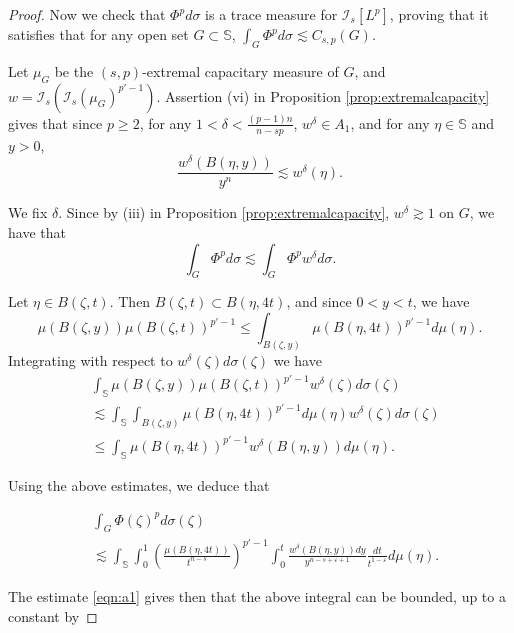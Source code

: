 \documentclass[12pt,twoside,leqno,final]{amsart}
\theoremstyle{plain}
\begin{document}
\begin{proof}
Now we check that $\Phi^pd\sigma$ is a trace measure for $\mathcal{I}_s[L^p]$, proving that it satisfies that for any open set $G\subset {{\mathbb S}}$, $\int_G \Phi^pd\sigma\lesssim C_{s,p}(G)$. 

Let  $\mu_G$ be the $(s,p)$-extremal capacitary measure of $G$, and $w=\mathcal{I}_s(\mathcal{I}_s(\mu_G)^{p'-1})$. Assertion (vi) in Proposition  \ref{prop:extremalcapacity} gives that since $p\geq 2$, for any $1<\delta<\frac{(p-1)n}{n-sp}$, $w^\delta\in A_1$, and for any $\eta \in {{\mathbb S}}$ and $y>0$, $$\frac{w^\delta(B(\eta,y))}{y^n}\lesssim w^\delta(\eta).$$

 We fix $\delta$. Since by (iii) in Proposition \ref{prop:extremalcapacity}, $w^\delta \gtrsim 1$ on $G$, we have that
 $$
 \int_G \Phi^pd\sigma\lesssim \int_G \Phi^pw^\delta d\sigma.
 $$
 
 
 

Let $\eta\in B(\zeta,t)$. Then $B(\zeta,t)\subset B(\eta, 4t)$, and since $0<y<t$, we have
$$\mu(B(\zeta,y))\mu(B(\zeta,t))^{p'-1}\leq  \int_{B(\zeta,y)}\mu(B(\eta,4t))^{p'-1}d\mu(\eta).$$
Integrating with respect to $w^\delta(\zeta)d\sigma(\zeta)$ we have
\begin{equation*}\begin{split}&
\int_{{\mathbb S}}\mu(B(\zeta,y))\mu(B(\zeta,t))^{p'-1}w^\delta(\zeta)d\sigma(\zeta)\\& 
\lesssim \int_{{\mathbb S}}\int_{B(\zeta,y)}\mu(B(\eta,4t))^{p'-1}d\mu(\eta)w^\delta(\zeta)d\sigma(\zeta)\\
&\leq\int_{{\mathbb S}} \mu(B(\eta,4t))^{p'-1}w^\delta(B(\eta,y))d\mu(\eta).
\end{split}\end{equation*}

Using the above estimates, we deduce that

\begin{equation*}\begin{split}&
\int_{G} \Phi(\zeta)^p d\sigma(\zeta)\\&
\lesssim
\int_{{\mathbb S}}\int_0^1 \left(\frac{\mu(B(\eta,4t))}{t^{n-s}} \right)^{p'-1}\int_0^t \frac{w^\delta(B(\eta,y))dy}{y^{n-s+\varepsilon+1}}\frac{dt}{t^{1-\varepsilon}}d\mu(\eta).
\end{split}\end{equation*}

The estimate \eqref{eqn:a1} gives then that the above integral can be bounded, up to a constant by


\end{proof}
\end{document}

